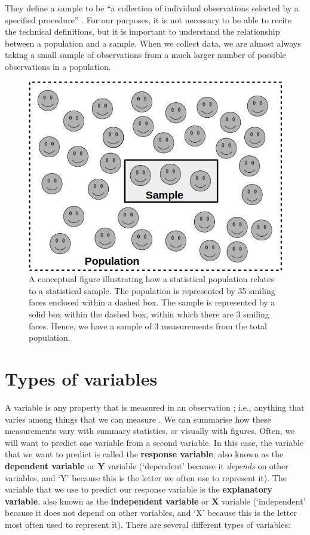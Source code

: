 \documentclass[
]{scrbook}
\begin{document}
They define a sample to be ``a collection of individual observations selected by a specified procedure'' \citep{Sokal1995}.
For our purposes, it is not necessary to be able to recite the technical definitions, but it is important to understand the relationship between a population and a sample.
When we collect data, we are almost always taking a small sample of observations from a much larger number of possible observations in a population.

\begin{figure}
\includegraphics[width=1\linewidth]{img/population_vs_sample} \caption{A conceptual figure illustrating how a statistical population relates to a statistical sample. The population is represented by 35 smiling faces enclosed within a dashed box. The sample is represented by a solid box within the dashed box, within which there are 3 smiling faces. Hence, we have a sample of 3 measurements from the total population.}\label{fig:unnamed-chunk-21}
\end{figure}

\hypertarget{Chapter_5}{%
\chapter{Types of variables}\label{Chapter_5}}

A variable is any property that is measured in an observation \citep{Sokal1995}; i.e., anything that varies among things that we can measure \citep{Dytham2011}.
We can summarise how these measurements vary with summary statistics, or visually with figures.
Often, we will want to predict one variable from a second variable.
In this case, the variable that we want to predict is called the \textbf{response variable}, also known as the \textbf{dependent variable} or \textbf{Y} variable (`dependent' because it \emph{depends} on other variables, and `Y' because this is the letter we often use to represent it).
The variable that we use to predict our response variable is the \textbf{explanatory variable}, also known as the \textbf{independent variable} or \textbf{X} variable (`independent' because it does not depend on other variables, and `X' because this is the letter most often used to represent it).
There are several different types of variables:
\end{document}
